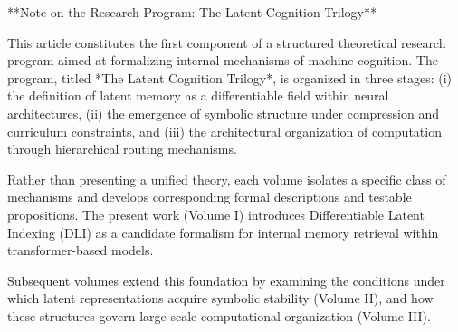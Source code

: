 **Note on the Research Program: The Latent Cognition Trilogy**

This article constitutes the first component of a structured theoretical research program aimed at formalizing internal mechanisms of machine cognition. The program, titled *The Latent Cognition Trilogy*, is organized in three stages: (i) the definition of latent memory as a differentiable field within neural architectures, (ii) the emergence of symbolic structure under compression and curriculum constraints, and (iii) the architectural organization of computation through hierarchical routing mechanisms.

Rather than presenting a unified theory, each volume isolates a specific class of mechanisms and develops corresponding formal descriptions and testable propositions. The present work (Volume I) introduces Differentiable Latent Indexing (DLI) as a candidate formalism for internal memory retrieval within transformer-based models.

Subsequent volumes extend this foundation by examining the conditions under which latent representations acquire symbolic stability (Volume II), and how these structures govern large-scale computational organization (Volume III).
